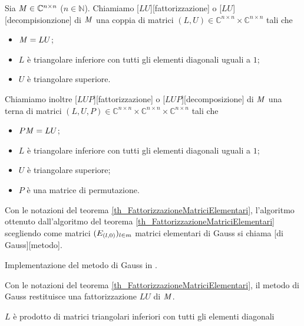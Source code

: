 \begin{Definition}
  Sia $\mathit{M} \in \mathbb{C}^{n \times n}$ ($n \in \mathbb{N}$). Chiamiamo
  [$LU$][fattorizzazione]
  o
  [$LU$][decompisionzione]
  di $\mathit{M}$ una coppia di matrici
  $(L,U) \in \mathbb{C}^{n \times n} \times \mathbb{C}^{n \times n}$
  tali che
  \begin{itemize}
    \item $\mathit{M} = LU$;
    \item $L$ \`e triangolare inferiore con tutti gli elementi diagonali uguali
      a $1$;
    \item $U$ \`e triangolare superiore.
  \end{itemize}
  Chiamiamo inoltre
  [$LUP$][fattorizzazione]
  o
  [$LUP$][decomposizione]
  di $\mathit{M}$ una terna di matrici
  $(L,U,P) \in
  \mathbb{C}^{n \times n} \times \mathbb{C}^{n \times n} \times \mathbb{C}^{n \times n}$
  tali che
  \begin{itemize}
    \item $P \mathit{M} = LU$;
    \item $L$ \`e triangolare inferiore con tutti gli elementi diagonali uguali
      a $1$;
    \item $U$ \`e triangolare superiore;
    \item $P$ \`e una matrice di permutazione.
  \end{itemize}
\end{Definition}
\begin{Definition}
  Con le notazioni del teorema \ref{th_FattorizzazioneMatriciElementari},
  l'algoritmo ottenuto dall'algoritmo del teorema \ref{th_FattorizzazioneMatriciElementari}
  scegliendo come matrici $(E_{(l,0)})_{l \in m}$ matrici elementari di Gauss
  si chiama
  [di Gauss][metodo].
\end{Definition}
\begin{listing}
	\caption{Implementazione del metodo di Gauss in .}
\end{listing}
\begin{Theorem}
  Con le notazioni del teorema \ref{th_FattorizzazioneMatriciElementari}, il metodo di Gauss
  restituisce una fattorizzazione $LU$ di $\mathit{M}$.
\end{Theorem}
\Proof $L$ \`e prodotto di matrici triangolari inferiori con tutti gli elementi diagonali
